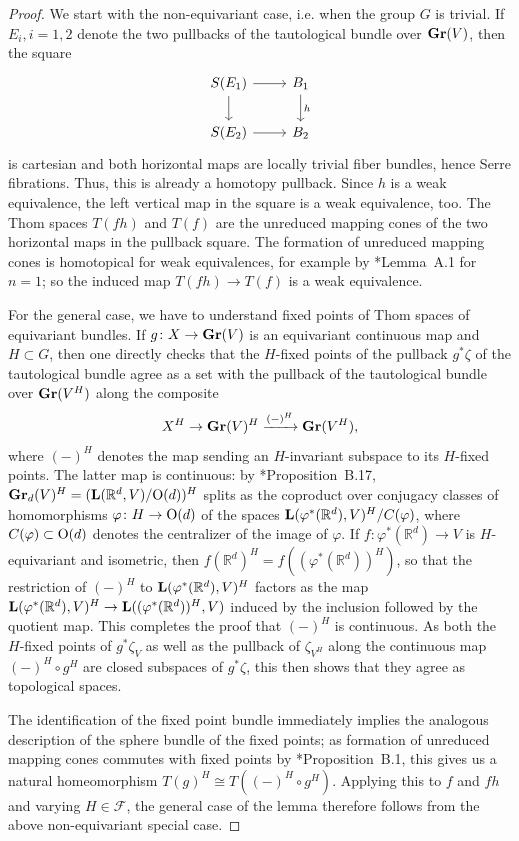 \documentclass[reqno]{memo-l}
\theoremstyle{mythm}
\theoremstyle{definition}
\numberwithin{equation}{section}
\newcommand{\Ff}{{\mathcal{F}}}
\newcommand{\R} {{\mathbb{R}}}
\renewcommand{\phi}{\varphi}
\newcommand{\cat}[1]{\textbf{\textup{#1}}}
\renewcommand{\O}{{\textup{O}}}
\newcommand{\Gr}{\cat{Gr}}
\begin{document}
\begin{proof}
  We start with the non-equivariant case, i.e. when the group $G$ is trivial. If $E_i,i=1,2$ denote the two pullbacks of the tautological bundle over $\Gr(V)$, then the square
  \[
  \begin{tikzcd}
  S(E_1)\arrow[r] \arrow[d]& B_1\arrow[d,"h"]  \\ 
  S(E_2)\arrow[r] & B_2
  \end{tikzcd}
  \]
  is cartesian and both horizontal maps are locally trivial fiber bundles, hence Serre fibrations. Thus, this is already a homotopy pullback. Since $h$ is a weak equivalence, the left vertical map in the square is a weak equivalence, too.
  The Thom spaces  $T(f h)$ and $T(f)$ are the unreduced mapping cones of the two horizontal maps
  in the pullback square.  
  The formation of unreduced mapping cones is homotopical for weak equivalences,
  for example by \cite{dugger-isaksen}*{Lemma~A.1} for $n=1$;
  so the induced map $T(fh)\to T(f)$ is a weak equivalence.

  For the general case, we have to understand fixed points of Thom spaces of equivariant bundles. If $g\colon X\to\cat{Gr}(V)$ is an equivariant continuous map and $H\subset G$, then one directly checks that the $H$-fixed points of the pullback $g^*\zeta$ of the tautological bundle agree as a set with the pullback of the tautological bundle over $\cat{Gr}(V^H)$ along the composite
  \[
    X^H\to\cat{Gr}(V)^H\xrightarrow{(-)^H}\cat{Gr}(V^H),
  \]
  where $(-)^H$ denotes the map sending an $H$-invariant subspace to its $H$-fixed points. The latter map is continuous: by \cite{schwede2018global}*{Proposition~B.17}, $\Gr_d(V)^H=(\cat{L}(\R^d,V)/\O(d))^H$ splits as the coproduct over conjugacy classes of homomorphisms $\phi\colon H\to\O(d)$ of the spaces $\cat{L}(\phi^*(\R^d),V)^H/C(\phi)$, where $C(\phi)\subset\O(d)$ denotes the centralizer of the image of $\phi$. If $f\colon\phi^*(\R^d)\to V$ is $H$-equivariant and isometric, then $f(\R^d)^H=f((\phi^*(\R^d))^{H})$, so that the restriction of $(-)^H$ to $\cat{L}(\phi^*(\R^d),V)^H$ factors as the map $\cat{L}(\phi^*(\R^d),V)^H\to\cat{L}((\phi^*(\R^d))^H,V)$ induced by the inclusion followed by the quotient map. This completes the proof that $(-)^H$ is continuous. As both the $H$-fixed points of $g^*\zeta_V$ as well as the pullback of $\zeta_{V^H}$ along the continuous map $(-)^H\circ g^H$ are closed subspaces of $g^*\zeta$, this then shows that they agree as topological spaces.
  
  The identification of the fixed point bundle immediately implies the analogous description of the sphere bundle of the fixed points; as formation of unreduced mapping cones commutes with fixed points by \cite{schwede2018global}*{Proposition~B.1}, this gives us a natural homeomorphism $T(g)^H\cong T((-)^H\circ g^H)$. Applying this to $f$ and $fh$ and varying $H\in\Ff$, the general case of the lemma therefore follows from the above non-equivariant special case.
\end{proof}
\end{document}
